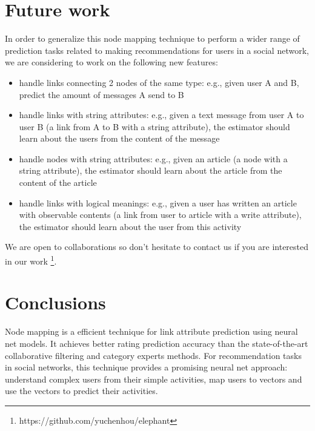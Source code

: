 \documentclass{article}
\begin{document}
\section{Future work}
In order to generalize this node mapping technique to perform a wider range of 
prediction tasks related to making recommendations for users in a social 
network, we are considering to work on the following new features:
\begin{itemize}
	\item handle links connecting 2 nodes of the same type: e.g., given user A 
	and B, predict the amount of messages A send to B
	\item handle links with string attributes: e.g., given a text message from 
	user A to user B (a link from A to B with a string attribute), the 
	estimator should learn about the users from the content of the message
	\item handle nodes with string attributes: e.g., given an article (a node 
	with a string attribute), the estimator should learn about the article from 
	the content of the article
	\item handle links with logical meanings: e.g., given a user has written an 
	article with observable contents (a link from user to article with a write 
	attribute), the estimator should learn about the user from this activity
\end{itemize}
We are open to collaborations so don't hesitate to contact us if you are 
interested in our work \footnote{https://github.com/yuchenhou/elephant}.

\section{Conclusions}
Node mapping is a efficient technique for link attribute prediction using 
neural net models.
It achieves better rating prediction accuracy than the state-of-the-art 
collaborative filtering and category experts methods.
For recommendation tasks in social networks, this technique provides a 
promising neural net approach:
understand complex users from their simple activities, map users to 
vectors and use the vectors to predict their activities.



\end{document}
